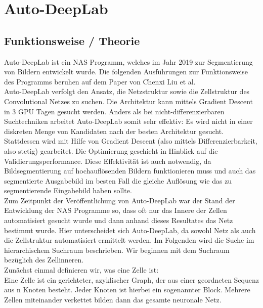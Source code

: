 \chapter{Auto-DeepLab}
\label{ch:autodeeplab}



\section{Funktionsweise / Theorie}

Auto-DeepLab ist ein NAS Programm, welches im Jahr 2019 zur Segmentierung von Bildern entwickelt wurde. Die folgenden Ausführungen zur Funktionsweise des Programms beruhen auf dem Paper \cite{autodeeplabPaper} von Chenxi Liu et al.\\
Auto-DeepLab verfolgt den Ansatz, die Netzstruktur sowie die Zellstruktur des Convolutional Netzes zu suchen. Die Architektur kann mittels Gradient Descent in 3 GPU Tagen gesucht werden. Anders als bei nicht-differenzierbaren Suchtechniken arbeitet Auto-DeepLab somit sehr effektiv: Es wird nicht in einer diskreten Menge von Kandidaten nach der besten Architektur gesucht. Stattdessen wird mit Hilfe von Gradient Descent (also mittels Differenzierbarkeit, also stetig) gearbeitet. Die Optimierung geschieht in Hinblick auf die Validierungsperformance. Diese Effektivität ist auch notwendig, da Bildsegmentierung auf hochauflösenden Bildern funktionieren muss und auch das segmentierte Ausgabebild im besten Fall die gleiche Auflösung wie das zu segmentierende Eingabebild haben sollte.\\
Zum Zeitpunkt der Veröffentlichung von Auto-DeepLab war der Stand der Entwicklung der NAS Programme so, dass oft nur das Innere der Zellen automatisiert gesucht wurde und dann anhand dieses Resultates das Netz bestimmt wurde. Hier unterscheidet sich Auto-DeepLab, da sowohl Netz als auch die Zellstruktur automatisiert ermittelt werden.
Im Folgenden wird die Suche im hierarchischem Suchraum beschrieben. Wir beginnen mit dem Suchraum bezüglich des Zellinneren.\\[0.3cm]
Zunächst einmal definieren wir, was eine Zelle ist:\\
Eine Zelle ist ein gerichteter, azyklischer Graph, der aus einer geordneten Sequenz aus n Knoten besteht. Jeder Knoten ist hierbei ein sogenannter Block. Mehrere Zellen miteinander verkettet bilden dann das gesamte neuronale Netz.\\
